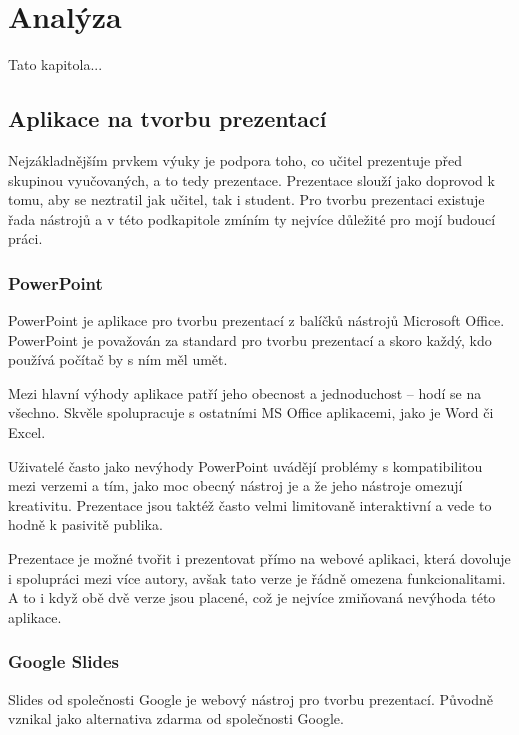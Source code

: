 \chapter{Analýza}

\begin{chapterabstract}
Tato kapitola...
\end{chapterabstract}

\section{Aplikace na tvorbu prezentací}

Nejzákladnějším prvkem výuky je podpora toho, co učitel prezentuje před skupinou vyučovaných, a to tedy prezentace. 
Prezentace slouží jako doprovod k tomu, aby se neztratil jak učitel, tak i student. 
Pro tvorbu prezentaci existuje řada nástrojů a v této podkapitole zmíním ty nejvíce důležité pro mojí budoucí práci.

\subsection{PowerPoint}

PowerPoint je aplikace pro tvorbu prezentací z balíčků nástrojů Microsoft Office. 
PowerPoint je považován za standard pro tvorbu prezentací a skoro každý, kdo používá počítač by s ním měl umět.

Mezi hlavní výhody aplikace patří jeho obecnost a jednoduchost -- hodí se na všechno. 
Skvěle spolupracuje s ostatními MS Office aplikacemi, jako je Word či Excel. 

Uživatelé často jako nevýhody PowerPoint uvádějí problémy s kompatibilitou mezi verzemi a tím, jako moc obecný nástroj je a že jeho nástroje omezují kreativitu. 
Prezentace jsou taktéž často velmi limitovaně interaktivní a vede to hodně k pasivitě publika.

Prezentace je možné tvořit i prezentovat přímo na webové aplikaci, která dovoluje i spolupráci mezi více autory, avšak tato verze je řádně omezena funkcionalitami.
A to i když obě dvě verze jsou placené, což je nejvíce zmiňovaná nevýhoda této aplikace.

\subsection{Google Slides}

Slides od společnosti Google je webový nástroj pro tvorbu prezentací. Původně vznikal jako alternativa zdarma od společnosti Google. 

